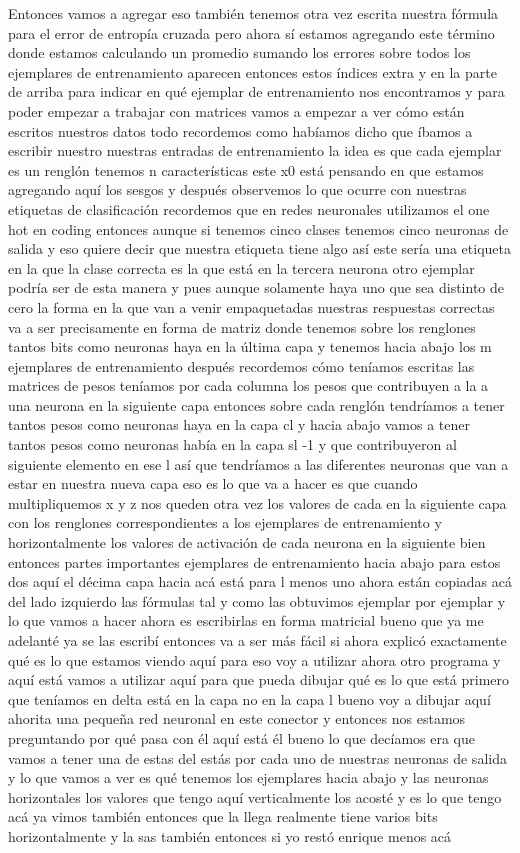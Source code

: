 Entonces vamos a agregar eso también tenemos otra vez escrita nuestra fórmula para el error de entropía cruzada pero ahora sí estamos agregando este término donde estamos calculando un promedio sumando los errores sobre todos los ejemplares de entrenamiento aparecen entonces estos índices extra y en la parte de arriba para indicar en qué ejemplar de entrenamiento nos encontramos y para poder empezar a trabajar con matrices vamos a empezar a ver cómo están escritos nuestros datos todo recordemos como habíamos dicho que íbamos a escribir nuestro nuestras entradas de entrenamiento la idea es que cada ejemplar es un renglón tenemos n características este x0 está pensando en que estamos agregando aquí los sesgos y después observemos lo que ocurre con nuestras etiquetas de clasificación recordemos que en redes neuronales utilizamos el one hot en coding entonces aunque si tenemos cinco clases tenemos cinco neuronas de salida y eso quiere decir que nuestra etiqueta tiene algo así este sería una etiqueta en la que la clase correcta es la que está en la tercera neurona otro ejemplar podría ser de esta manera y pues aunque solamente haya uno que sea distinto de cero la forma en la que van a venir empaquetadas nuestras respuestas correctas va a ser precisamente en forma de matriz donde tenemos sobre los renglones tantos bits como neuronas haya en la última capa y tenemos hacia abajo los m ejemplares de entrenamiento después recordemos cómo teníamos escritas las matrices de pesos teníamos por cada columna los pesos que contribuyen a la a una neurona en la siguiente capa entonces sobre cada renglón tendríamos a tener tantos pesos como neuronas haya en la capa cl y hacia abajo vamos a tener tantos pesos como neuronas había en la capa sl -1 y que contribuyeron al siguiente elemento en ese l así que tendríamos a las diferentes neuronas que van a estar en nuestra nueva capa eso es lo que va a hacer es que cuando multipliquemos x y z nos queden otra vez los valores de cada en la siguiente capa con los renglones correspondientes a los ejemplares de entrenamiento y horizontalmente los valores de activación de cada neurona en la siguiente bien entonces partes importantes ejemplares de entrenamiento hacia abajo para estos dos aquí el décima capa hacia acá está para l menos uno ahora están copiadas acá del lado izquierdo las fórmulas tal y como las obtuvimos ejemplar por ejemplar y lo que vamos a hacer ahora es escribirlas en forma matricial bueno que ya me adelanté ya se las escribí entonces va a ser más fácil si ahora explicó exactamente qué es lo que estamos viendo aquí para eso voy a utilizar ahora otro programa y aquí está vamos a utilizar aquí para que pueda dibujar qué es lo que está primero que teníamos en delta está en la capa no en la capa l bueno voy a dibujar aquí ahorita una pequeña red neuronal en este conector y entonces nos estamos preguntando por qué pasa con él aquí está él bueno lo que decíamos era que vamos a tener una de estas del estás por cada uno de nuestras neuronas de salida y lo que vamos a ver es qué tenemos los ejemplares hacia abajo y las neuronas horizontales los valores que tengo aquí verticalmente los acosté y es lo que tengo acá ya vimos también entonces que la llega realmente tiene varios bits horizontalmente y la sas también entonces si yo restó enrique menos acá 